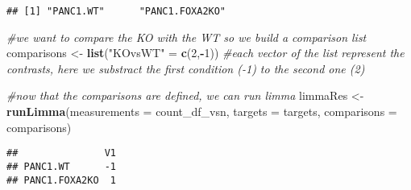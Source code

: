 \documentclass[]{article}
\newenvironment{Shaded}{\begin{snugshade}}{\end{snugshade}}
\newcommand{\CommentTok}[1]{\textcolor[rgb]{0.56,0.35,0.01}{\textit{#1}}}
\newcommand{\DataTypeTok}[1]{\textcolor[rgb]{0.13,0.29,0.53}{#1}}
\newcommand{\DecValTok}[1]{\textcolor[rgb]{0.00,0.00,0.81}{#1}}
\newcommand{\KeywordTok}[1]{\textcolor[rgb]{0.13,0.29,0.53}{\textbf{#1}}}
\newcommand{\NormalTok}[1]{#1}
\newcommand{\OperatorTok}[1]{\textcolor[rgb]{0.81,0.36,0.00}{\textbf{#1}}}
\newcommand{\StringTok}[1]{\textcolor[rgb]{0.31,0.60,0.02}{#1}}
\begin{document}
\begin{Shaded}
\end{Shaded}

\begin{verbatim}
## [1] "PANC1.WT"      "PANC1.FOXA2KO"
\end{verbatim}

\begin{Shaded}
\begin{Highlighting}[]
\CommentTok{#we want to compare the KO with the WT so we build a comparison list}
\NormalTok{comparisons <-}\StringTok{ }\KeywordTok{list}\NormalTok{(}\StringTok{"KOvsWT"}\NormalTok{ =}\StringTok{ }\KeywordTok{c}\NormalTok{(}\DecValTok{2}\NormalTok{,}\OperatorTok{-}\DecValTok{1}\NormalTok{)) }\CommentTok{#each vector of the list represent the contrasts, here we substract the first condition (-1) to the second one (2)}

\CommentTok{#now that the comparisons are defined, we can run limma}
\NormalTok{limmaRes <-}\StringTok{ }\KeywordTok{runLimma}\NormalTok{(}\DataTypeTok{measurements =}\NormalTok{ count_df_vsn, }
                     \DataTypeTok{targets =}\NormalTok{ targets, }
                     \DataTypeTok{comparisons =}\NormalTok{ comparisons)}
\end{Highlighting}
\end{Shaded}

\begin{verbatim}
##               V1
## PANC1.WT      -1
## PANC1.FOXA2KO  1
\end{verbatim}

\begin{Shaded}
\end{Shaded}
\end{document}
